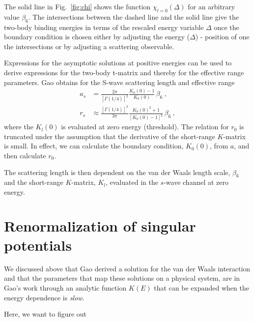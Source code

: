 \documentclass[aps,preprint,superscriptaddress]{revtex4-1}
\begin{document}
The solid line in Fig.~\ref{fig:chi} shows the function
$\chi_{l=0}(\Delta)$ for an arbitrary value $\beta_6$. The
intersections between the dashed line and the solid line give the
two-body binding energies in terms of the rescaled energy variable
$\Delta$ once the boundary condition is chosen either by adjusting the
energy ($\Delta$) - position of one the intersections or by adjusting
a scattering observable.

Expressions for the asymptotic solutions at positive energies can be
used to derive expressions for the two-body t-matrix and thereby for
the effective range parameters. Gao obtains for the S-wave scattering
length and effective range~\cite{PhysRevA.58.4222}
\begin{equation}
  \begin{split}
    \label{eq:gao_a_and_r}
      a_s & = \frac{2\pi}{{[\Gamma(1/4)]}^2}\frac{K_0(0) -
        1}{K_0(0)}\, \beta_6~, \\
      r_s & \approx \frac{{[\Gamma(1/4)]}^2}{3\pi} \frac{K_0{(0)}^2 +
        1}{{[K_0(0)-1]}^2}\, \beta_6~,
  \end{split}
\end{equation}
where the $K_l(0)$ is evaluated at zero energy (threshold).  The
relation for $r_0$ is truncated under the assumption that the
derivative of the short-range $K$-matrix is small.  In effect, we can
calculate the boundary condition, $K_0(0)$, from $a$, and then
calculate $r_0$.

The scattering length is then dependent on the van der Waals length scale,
$\beta_6$ and the short-range $K$-matrix, $K_{l}$, evaluated in the $s$-wave
channel at zero energy.
\section{Renormalization of singular potentials}
We discussed above that Gao derived a solution for the van der Waals
interaction and that the parameters that map these solutions on a
physical system, are in Gao's work through an analytic function $K(E)$
that can be expanded when the energy dependence is {\it slow}.

Here, we want to figure out 
\end{document}
